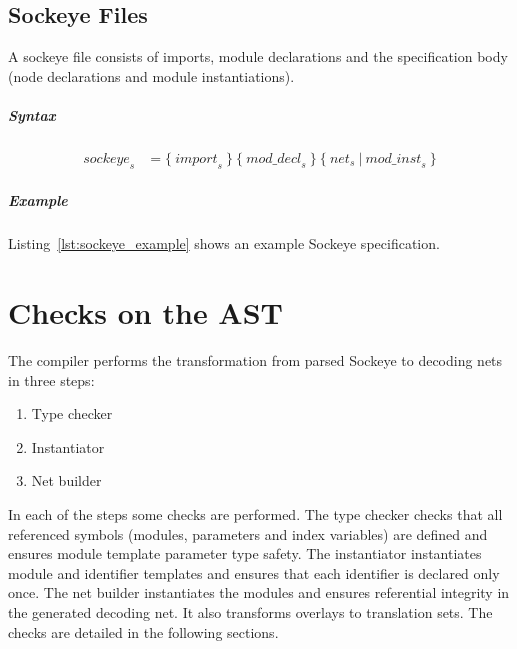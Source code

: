 \documentclass[a4paper,11pt,twoside]{report}
\begin{document}
{{{\section{Sockeye Files}
A sockeye file consists of imports, module declarations and the specification body (node declarations and module instantiations).

\paragraph{Syntax}
\begin{align*}
    \textit{sockeye}_s & \mathop{=}
        \big\{\ 
            \textit{import}_s\ 
        \big\}\ 
        \big\{\ 
            \textit{mod\_decl}_s\ 
        \big\}\ 
        \big\{\ 
            \textit{net}_s\ |\ \textit{mod\_inst}_s\ 
        \big\}
\end{align*}

\paragraph{Example}
Listing~\ref{lst:sockeye_example} shows an example Sockeye specification.

\clearpage



\chapter{Checks on the AST}
\label{chap:checks}
The compiler performs the transformation from parsed Sockeye to decoding nets in three steps:
\begin{enumerate}
    \item Type checker
    \item Instantiator
    \item Net builder
\end{enumerate}
In each of the steps some checks are performed.
The type checker checks that all referenced symbols (modules, parameters and index variables) are defined and ensures module template parameter type safety.
The instantiator instantiates module and identifier templates and ensures that each identifier is declared only once.
The net builder instantiates the modules and ensures referential integrity in the generated decoding net. It also transforms overlays to translation sets.
The checks are detailed in the following sections.

}}}
\end{document}
